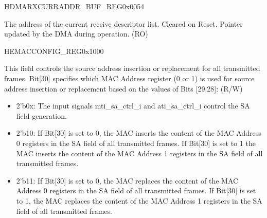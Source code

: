 \begin{register}{H}{DMARXCURRADDR\_BUF\_REG}{0x0054}\label{regdesc:DMARXCURRADDRBUFREG}
%
\regnewline%
\begin{regdesc}\begin{reglist}
\item [RECV\_BUFF\_ADDR\_PTR]The address of the current receive descriptor list. Cleared on Reset. Pointer updated by the DMA during operation. (RO)
\end{reglist}\end{regdesc}
\end{register}


\begin{register}{H}{EMACCONFIG\_REG}{0x1000}\label{regdesc:EMACCONFIGREG}
%
%
%
%
%
%
%
%
%
%
%
%
%
%
%
%
%
%
%
%
%
%
%
%
\regnewline%
\begin{regdesc}\begin{reglist}
\item [SAIRC]This field controls the source address insertion or replacement for all transmitted frames. Bit[30] specifies which MAC Address register (0 or 1) is used for source address insertion or replacement based on the values of Bits [29:28]: (R/W) \begin{itemize}
\item 2'b0x: The input signals mti\_sa\_ctrl\_i and ati\_sa\_ctrl\_i control the SA field generation. \item  2'b10: If Bit[30] is set to 0, the MAC inserts the content of the MAC Address 0 registers in the SA field of all transmitted frames. If Bit[30] is set to 1 the MAC inserts the content of the MAC Address 1 registers in the SA field of all transmitted frames. \item 2'b11: If Bit[30] is set to 0, the MAC replaces the content of the MAC Address 0 registers in the SA field of all transmitted frames. If Bit[30] is set to 1, the MAC replaces the content of the MAC Address 1 registers in the SA field of all transmitted frames.\end{itemize}

\end{reglist}
\end{regdesc}
\end{register}
